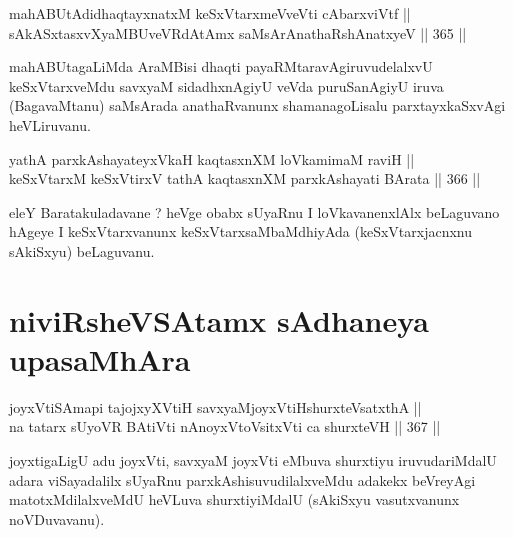 \begin{shl}
\footnotemark[1]mahABUtAdidhaqtayxnatxM keSxVtarxmeVveVti cAbarxviVtf || \\
sAkASxtasxvXyaMBUveVRdAtAmx saMsArAnathaRshAnatxyeV \hfill || 365 ||  
\end{shl}

\begin{artha}
mahABUtagaLiMda AraMBisi dhaqti payaRMtaravAgiruvudelalxvU
keSxVtarxveMdu savxyaM sidadhxnAgiyU veVda puruSanAgiyU iruva
(BagavaMtanu) saMsArada anathaRvanunx shamanagoLisalu parxtayxkaSxvAgi
heVLiruvanu.
\end{artha}


\begin{shl}
yathA parxkAshayateyxVkaH kaqtasxnXM loVkamimaM raviH || \\
keSxVtarxM keSxVtirxV tathA kaqtasxnXM parxkAshayati BArata \hfill || 366 ||  
\end{shl}

\begin{artha}
eleY Baratakuladavane ? heVge obabx sUyaRnu I loVkavanenxlAlx
beLaguvano hAgeye I keSxVtarxvanunx keSxVtarxsaMbaMdhiyAda
(keSxVtarxjacnxnu sAkiSxyu) beLaguvanu.
\end{artha}

\section*{niviRsheVSAtamx sAdhaneya upasaMhAra}


\begin{shl}
joyxVtiSAmapi tajojxyXVtiH savxyaMjoyxVtiHshurxteVsatxthA || \\
na tatarx sUyoVR BAtiVti nAnoyxV\s toV\s sitxVti ca shurxteVH \hfill || 367 ||  
\end{shl}

\begin{artha}
joyxtigaLigU adu joyxVti, savxyaM joyxVti eMbuva shurxtiyu
iruvudariMdalU adara viSayadalilx sUyaRnu parxkAshisuvudilalxveMdu
adakekx beVreyAgi matotxMdilalxveMdU heVLuva shurxtiyiMdalU (sAkiSxyu
vasutxvanunx noVDuvavanu).
\end{artha}

